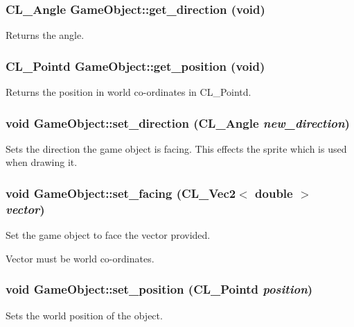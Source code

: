 \hypertarget{classGameObject_ad0bc20831ec6c1f4c8f953c9f2d2f267}{
\subsubsection[{get\_\-direction}]{\setlength{\rightskip}{0pt plus 5cm}CL\_\-Angle GameObject::get\_\-direction (void)}}
\label{classGameObject_ad0bc20831ec6c1f4c8f953c9f2d2f267}
Returns the angle. \hypertarget{classGameObject_a7b5c0d7e9729dff4a852518bbf4522af}{
\subsubsection[{get\_\-position}]{\setlength{\rightskip}{0pt plus 5cm}CL\_\-Pointd GameObject::get\_\-position (void)}}
\label{classGameObject_a7b5c0d7e9729dff4a852518bbf4522af}
Returns the position in world co-\/ordinates in CL\_\-Pointd. \hypertarget{classGameObject_ab9ec6aad5761262640a5ac771674a126}{
\subsubsection[{set\_\-direction}]{\setlength{\rightskip}{0pt plus 5cm}void GameObject::set\_\-direction (CL\_\-Angle {\em new\_\-direction})}}
\label{classGameObject_ab9ec6aad5761262640a5ac771674a126}
Sets the direction the game object is facing. This effects the sprite which is used when drawing it. \hypertarget{classGameObject_a82f278ce2767bee4024daf2885209e62}{
\subsubsection[{set\_\-facing}]{\setlength{\rightskip}{0pt plus 5cm}void GameObject::set\_\-facing (CL\_\-Vec2$<$ double $>$ {\em vector})}}
\label{classGameObject_a82f278ce2767bee4024daf2885209e62}
Set the game object to face the vector provided.

Vector must be world co-\/ordinates. \hypertarget{classGameObject_a99a3cd93296266a8e482a90e9e9def96}{
\subsubsection[{set\_\-position}]{\setlength{\rightskip}{0pt plus 5cm}void GameObject::set\_\-position (CL\_\-Pointd {\em position})}}
\label{classGameObject_a99a3cd93296266a8e482a90e9e9def96}
Sets the world position of the object.

